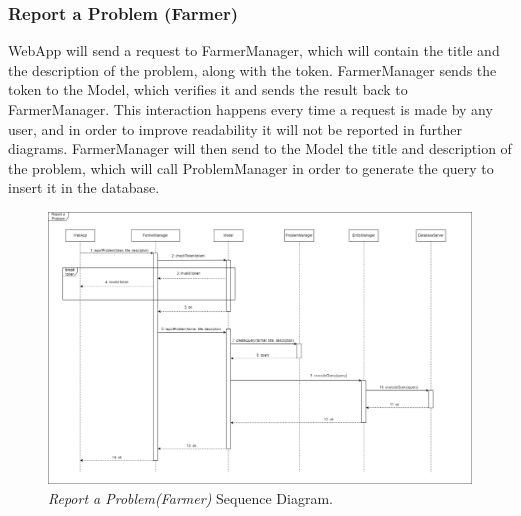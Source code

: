 \subsubsection{Report a Problem (Farmer)}
WebApp will send a request to FarmerManager, which will contain the title and the description of the problem, along with the token. FarmerManager sends the token to the Model, which verifies it and sends the result back to FarmerManager. This interaction happens every time a request is made by any user, and in order to improve readability it will not be reported in further diagrams. FarmerManager will then send to the Model the title and description of the problem, which will call ProblemManager in order to generate the query to insert it in the database.
\begin{figure}[H]
    \centering
    \includegraphics[width=\textwidth]{Images/Sequence Diagram/ReportProblem.png}
    \caption{\textit{Report a Problem(Farmer)} Sequence Diagram.}
\end{figure}
\newpage
